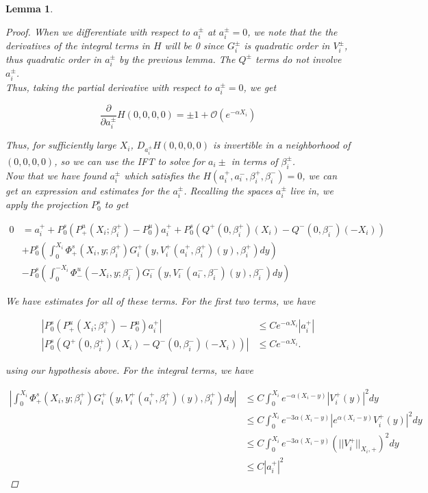 \documentclass[12pt]{article}
\newtheorem{lemma}{Lemma}
\begin{document}
\begin{lemma}
\begin{proof}
When we differentiate with respect to $a_i^\pm$ at $a_i^\pm = 0$, we note that the the derivatives of the integral terms in $H$ will be 0 since $G_i^\pm$ is quadratic order in $V_i^\pm$, thus quadratic order in $a_i^\pm$ by the previous lemma. The $Q^\pm$ terms do not involve $a_i^\pm$.\\

Thus, taking the partial derivative with respect to $a_i^\pm = 0$, we get

\[
\frac{\partial}{\partial a_i^\pm} H(0, 0, 0, 0) = \pm 1 + \mathcal{O} (e^{-\alpha X_i})
\]

Thus, for sufficiently large $X_i$, $D_{a_i^\pm} H(0, 0, 0, 0)$ is invertible in a neighborhood of $(0, 0, 0, 0)$, so we can use the IFT to solve for $a_i\pm$ in terms of $\beta_i^\pm$. \\

Now that we have found $a_i^\pm$ which satisfies the $H(a_i^+, a_i^-, \beta_i^+, \beta_i^-) = 0$, we can get an expression and estimates for the $a_i^\pm$. Recalling the spaces $a_i^\pm$ live in, we apply the projection $P^s_0$ to get

\begin{align*}
0 &= a_i^+ + P^s_0(P^u_+(X_i; \beta_i^+) -  P^u_0)a_i^+ 
+ P^s_0 \left( Q^+(0, \beta_i^+)(X_i) - Q^-(0, \beta_i^-)(-X_i) \right)\\
&+ P^s_0 \left( \int_0^{X_i} \Phi_+^s(X_i, y; \beta_i^+) G_i^+(y, V_i^+(a_i^+, \beta_i^+)(y),\beta_i^+)dy \right) \\
&- P^s_0 \left( \int_0^{-X_i} \Phi_-^u(-X_i, y; \beta_i^-) G_i^-(y, V_i^-(a_i^-, \beta_i^-)(y),\beta_i^-) dy \right)
\end{align*}

We have estimates for all of these terms. For the first two terms, we have

\begin{align*}
|P^s_0(P^u_+(X_i; \beta_i^+) -  P^u_0)a_i^+ | &\leq C e^{-\alpha X_i} |a_i^+| \\
|P^s_0 \left( Q^+(0, \beta_i^+)(X_i) - Q^-(0, \beta_i^-)(-X_i) \right)| &\leq C e^{-\alpha X_i}.
\end{align*}

using our hypothesis above. For the integral terms, we have

\begin{align*}
\left| \int_0^{X_i} \Phi_+^s(X_i, y; \beta_i^+) G_i^+(y, V_i^+(a_i^+, \beta_i^+)(y),\beta_i^+)dy \right| &\leq C \int_0^{X_i}e^{-\alpha(X_i - y)} |V_i^+(y)|^2 dy \\
&\leq C \int_0^{X_i}e^{-3 \alpha (X_i - y)} |e^{\alpha(X_i - y)} V_i^+(y)|^2 dy \\
&\leq C \int_0^{X_i}e^{-3 \alpha (X_i - y)} (||V_i^+||_{X_i, +})^2 dy \\
&\leq C |a_i^+|^2
\end{align*}


\end{proof}
\end{lemma}
\end{document}
